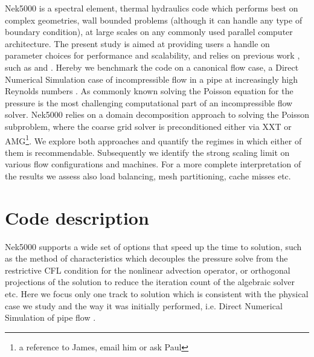 \documentclass{sig-alternate}
\begin{document}
Nek5000 is a spectral element, thermal hydraulics code which performs best on
complex geometries, wall bounded problems (although it can handle any type of
boundary condition), at large scales on any commonly used parallel computer
architecture. The present study is aimed at providing users a handle on
parameter choices for performance and scalability, and relies on previous work ,
such as \cite{fischer:scaling} and \cite{tufo:terascale}. Hereby we benchmark
the code on a canonical flow case, a Direct Numerical Simulation case of
incompressible flow in a pipe at increasingly high Reynolds numbers
\cite{Khoury2013}. As commonly known solving the Poisson equation for the
pressure is the most challenging computational part of an incompressible flow
solver. Nek5000 relies on a domain decomposition approach to solving the Poisson
subproblem, where the coarse grid solver is preconditioned either via XXT \cite{Tufo2001151} or AMG\footnote{a reference to James, email him or ask Paul}. We explore both approaches and quantify the regimes in which either of them is recommendable. Subsequently we identify the strong scaling limit on various flow configurations and machines. For a more complete interpretation of the results we assess also load balancing, mesh partitioning, cache misses etc. 

\section{Code description}
Nek5000 supports a wide set of options that speed up the time to solution, such
as the method of characteristics which decouples the pressure solve from the
restrictive CFL condition for the nonlinear advection operator, or orthogonal
projections of the solution to reduce the iteration count of the algebraic
solver etc. Here we focus only one track to solution which is consistent with
the physical case we study and the way it was initially performed, i.e. Direct Numerical Simulation of pipe flow \cite{Khoury2013}.
\end{document}
